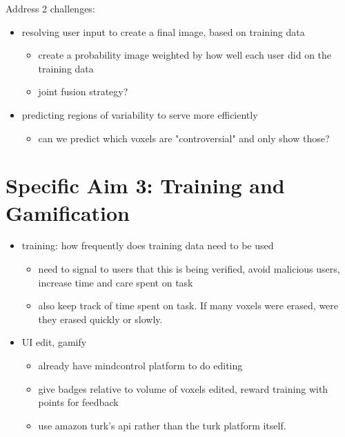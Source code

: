 Address 2 challenges:
\begin{itemize}
\item resolving user input to create a final image, based on training data
\begin{itemize}
\item create a probability image weighted by how well each user did on the training data
\item joint fusion strategy?
\end{itemize}
\item predicting regions of variability to serve more efficiently
\begin{itemize}
\item can we predict which voxels are "controversial" and only show those?
\end{itemize}
\end{itemize}

\section{Specific Aim 3: Training and Gamification}
\begin{itemize}
\item training: how frequently does training data need to be used
\begin{itemize}
\item need to signal to users that this is being verified, avoid malicious users, increase time and care spent on task
\item also keep track of time spent on task. If many voxels were erased, were they erased quickly or slowly. 
\end{itemize}
\item UI edit, gamify
\begin{itemize}
\item already have mindcontrol platform to do editing
\item give badges relative to volume of voxels edited, reward training with points for feedback
\item use amazon turk's api rather than the turk platform itself. 
\end{itemize}
\end{itemize}